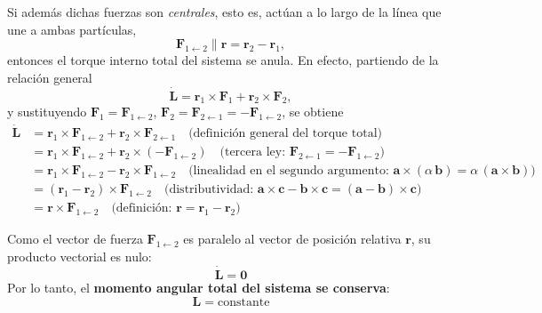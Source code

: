 \documentclass{article}
\begin{document}
Si además dichas fuerzas son \emph{centrales}, esto es, actúan a lo largo de la línea que une a ambas partículas,
\[
\boldsymbol{F}_{1\leftarrow 2} \parallel \boldsymbol{r} = \boldsymbol{r}_2 - \boldsymbol{r}_1,
\]
entonces el torque interno total del sistema se anula.  
En efecto, partiendo de la relación general
\[
\dot{\boldsymbol{L}} = \boldsymbol{r}_1 \times \boldsymbol{F}_1 + \boldsymbol{r}_2 \times \boldsymbol{F}_2,
\]
y sustituyendo \(\boldsymbol{F}_1 = \boldsymbol{F}_{1\leftarrow 2}\), \(\boldsymbol{F}_2 = \boldsymbol{F}_{2\leftarrow 1} = -\boldsymbol{F}_{1\leftarrow 2}\), se obtiene
\begin{equation}
\begin{split}
\dot{\boldsymbol{L}} 
&= \boldsymbol{r}_1 \times \boldsymbol{F}_{1\leftarrow 2} 
   + \boldsymbol{r}_2 \times \boldsymbol{F}_{2\leftarrow 1} 
   \quad \text{(definición general del torque total)} \\[6pt]
&= \boldsymbol{r}_1 \times \boldsymbol{F}_{1\leftarrow 2} 
   + \boldsymbol{r}_2 \times (-\boldsymbol{F}_{1\leftarrow 2})
   \quad \text{(tercera ley: } \boldsymbol{F}_{2\leftarrow 1}=-\boldsymbol{F}_{1\leftarrow 2}\text{)} \\[6pt]
&= \boldsymbol{r}_1 \times \boldsymbol{F}_{1\leftarrow 2} 
   - \boldsymbol{r}_2 \times \boldsymbol{F}_{1\leftarrow 2}
   \quad \text{(linealidad en el segundo argumento: } \boldsymbol{a}\times(\alpha\,\boldsymbol{b})=\alpha\,(\boldsymbol{a}\times\boldsymbol{b})\text{)} \\[6pt]
&= (\boldsymbol{r}_1 - \boldsymbol{r}_2)\times \boldsymbol{F}_{1\leftarrow 2}
   \quad \text{(distributividad: } \boldsymbol{a}\times\boldsymbol{c} - \boldsymbol{b}\times\boldsymbol{c}
   = (\boldsymbol{a}-\boldsymbol{b})\times\boldsymbol{c}\text{)} \\[6pt]
&= \boldsymbol{r}\times \boldsymbol{F}_{1\leftarrow 2}
   \quad \text{(definición: } \boldsymbol{r}=\boldsymbol{r}_1-\boldsymbol{r}_2\text{)}
\end{split}
\label{eq:torque-interno}
\end{equation}


Como el vector de fuerza \(\boldsymbol{F}_{1\leftarrow 2}\) es paralelo al vector de posición relativa \(\boldsymbol{r}\),
su producto vectorial es nulo:
\[
\boxed{\ \dot{\boldsymbol{L}} = \boldsymbol{0}\ }
\]
Por lo tanto, el \textbf{momento angular total del sistema se conserva}:
\[
\boxed{\ \boldsymbol{L} = \text{constante}\ }
\]

\vspace{0.5cm}
\end{document}
